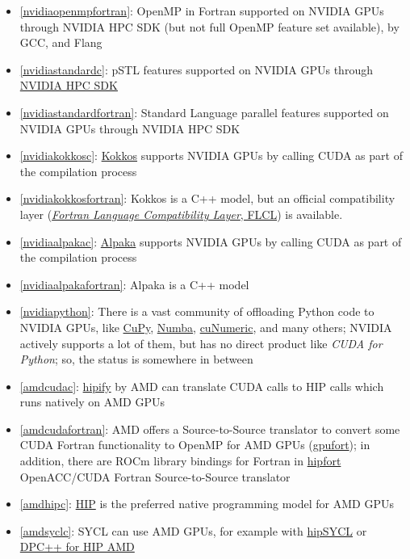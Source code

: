 \begin{frame}[allowframebreaks]
\begin{itemize}
        \item \ref{nvidiaopenmpfortran}: OpenMP in Fortran supported on NVIDIA GPUs through NVIDIA HPC SDK (but not full OpenMP feature set available), by GCC, and Flang
        \item \ref{nvidiastandardc}: pSTL features supported on NVIDIA GPUs through \href{https://docs.nvidia.com/hpc-sdk/compilers/c++-parallel-algorithms/}{NVIDIA HPC SDK}
        \item \ref{nvidiastandardfortran}: Standard Language parallel features supported on NVIDIA GPUs through NVIDIA HPC SDK
        \item \ref{nvidiakokkosc}: \href{https://github.com/kokkos/kokkos}{Kokkos} supports NVIDIA GPUs by calling CUDA as part of the compilation process
        \item \ref{nvidiakokkosfortran}: Kokkos is a C++ model, but an official compatibility layer (\href{https://github.com/kokkos/kokkos-fortran-interop}{\emph{Fortran Language Compatibility Layer}, FLCL}) is available.
        \item \ref{nvidiaalpakac}: \href{https://github.com/alpaka-group/alpaka}{Alpaka} supports NVIDIA GPUs by calling CUDA as part of the compilation process
        \item \ref{nvidiaalpakafortran}: Alpaka is a C++ model
        \item \ref{nvidiapython}: There is a vast community of offloading Python code to NVIDIA GPUs, like \href{https://cupy.dev/}{CuPy}, \href{https://numba.pydata.org/}{Numba}, \href{https://developer.nvidia.com/cunumeric}{cuNumeric}, and many others; NVIDIA actively supports a lot of them, but has no direct product like \emph{CUDA for Python}; so, the status is somewhere in between
        \item \ref{amdcudac}: \href{https://github.com/ROCm-Developer-Tools/HIPIFY}{hipify} by AMD can translate CUDA calls to HIP calls which runs natively on AMD GPUs
        \item \ref{amdcudafortran}: AMD offers a Source-to-Source translator to convert some CUDA Fortran functionality to OpenMP for AMD GPUs (\href{https://github.com/ROCmSoftwarePlatform/gpufort}{gpufort}); in addition, there are ROCm library bindings for Fortran in \href{https://github.com/ROCmSoftwarePlatform/hipfort}{hipfort} OpenACC/CUDA Fortran Source-to-Source translator
        \item \ref{amdhipc}: \href{https://github.com/ROCm-Developer-Tools/HIP}{HIP} is the preferred native programming model for AMD GPUs
        \item \ref{amdsyclc}: SYCL can use AMD GPUs, for example with \href{https://github.com/illuhad/hipSYCL}{hipSYCL} or \href{https://github.com/intel/llvm/blob/sycl/sycl/doc/GetStartedGuide.md\#build-dpc-toolchain-with-support-for-hip-amd}{DPC++ for HIP AMD}

\end{itemize}
\end{frame}
